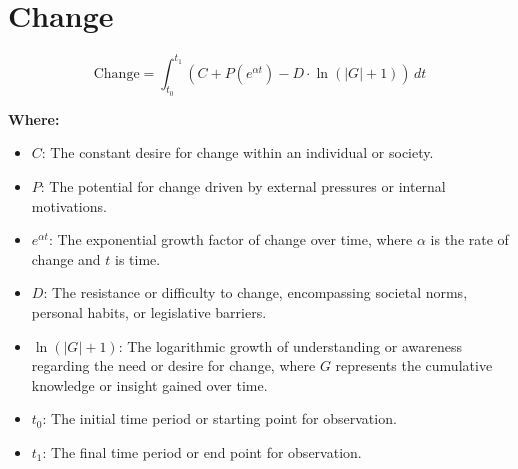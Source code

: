 \chapter{Change}

\begin{equation}
\text{Change} = \int_{t_0}^{t_1} (C + P(e^{\alpha t}) - D \cdot \ln(|G| + 1))\,dt
\end{equation}

\textbf{Where:}

\begin{itemize}
    \item $C$: The constant desire for change within an individual or society.
    \item $P$: The potential for change driven by external pressures or internal motivations.
    \item $e^{\alpha t}$: The exponential growth factor of change over time, where $\alpha$ is the rate of change and $t$ is time.
    \item $D$: The resistance or difficulty to change, encompassing societal norms, personal habits, or legislative barriers.
    \item $\ln(|G| + 1)$: The logarithmic growth of understanding or awareness regarding the need or desire for change, where $G$ represents the cumulative knowledge or insight gained over time.
    \item $t_0$: The initial time period or starting point for observation.
    \item $t_1$: The final time period or end point for observation.
\end{itemize}